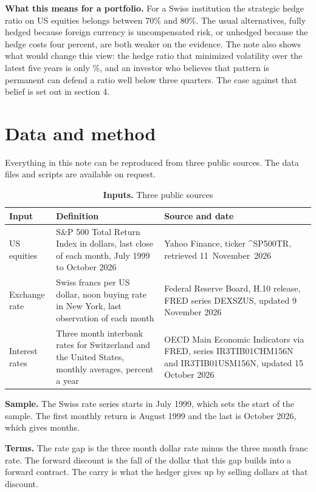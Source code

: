 \documentclass[a4paper,fontsize=10.2pt,parskip=half-]{scrartcl}
\newcommand{\lead}[1]{\textbf{#1}}
\begin{document}
\lead{What this means for a portfolio.} For a Swiss institution the strategic hedge ratio on US equities belongs between 70\% and 80\%. The usual alternatives, fully hedged because foreign currency is uncompensated risk, or unhedged because the hedge costs four percent, are both weaker on the evidence. The note also shows what would change this view: the hedge ratio that minimized volatility over the latest five years is only \RollHLast\%, and an investor who believes that pattern is permanent can defend a ratio well below three quarters. The case against that belief is set out in section 4.

\clearpage
\section{Data and method}

Everything in this note can be reproduced from three public sources. The data files and scripts are available on request.

\begin{table}[H]
\caption*{\textbf{Inputs.} Three public sources}
{\tabfont
\begin{tabularx}{\textwidth}{@{}L{2.4cm} Y L{6.2cm}@{}}
\toprule
Input & Definition & Source and date \\
\midrule
US equities & S\&P 500 Total Return Index in dollars, last close of each month, July 1999 to October 2026 & Yahoo Finance, ticker \textasciicircum SP500TR, retrieved 11~November~2026 \\
Exchange rate & Swiss francs per US dollar, noon buying rate in New York, last observation of each month & Federal Reserve Board, H.10 release, FRED series DEXSZUS, updated 9 November 2026 \\
Interest rates & Three month interbank rates for Switzerland and the United States, monthly averages, percent a year & OECD Main Economic Indicators via FRED, series IR3TIB01CHM156N and IR3TIB01USM156N, updated 15 October 2026 \\
\bottomrule
\end{tabularx}}
\end{table}

\lead{Sample.} The Swiss rate series starts in July 1999, which sets the start of the sample. The first monthly return is August 1999 and the last is October 2026, which gives \NMonths{} months.

\lead{Terms.} The rate gap is the three month dollar rate minus the three month franc rate. The forward discount is the fall of the dollar that this gap builds into a forward contract. The carry is what the hedger gives up by selling dollars at that discount.
\end{document}
